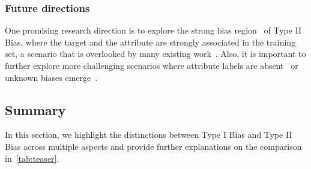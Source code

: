 





\subsubsection{Future directions}
One promising research direction is to explore the strong bias region~\cite{extreme_bias} of Type II Bias, where the target and the attribute are strongly associated in the training set, a scenario that is overlooked by many existing work~\cite{BlindEye_IMDB_eb, learn_not_to_learn_Colored_MNIST}.
Also, it is important to further explore more challenging scenarios where attribute labels are absent~\cite{HEX_texture_bias1, ReBias_texture_bias2,rubi} or unknown biases emerge~\cite{discover_unknown_bias,CNC,EIIL}. 



















































\subsection{Summary}
In this section, we highlight the distinctions between Type I Bias and Type II Bias across multiple aspects and provide further explanations on the comparison in~\cref{tab:teaser}.

